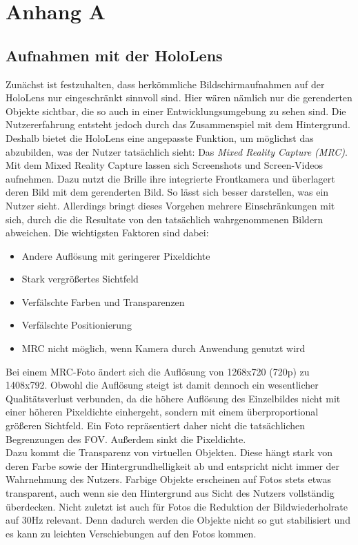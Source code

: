 \appendix 
\section{Anhang A}

\subsection{Aufnahmen mit der HoloLens}
Zunächst ist festzuhalten, dass herkömmliche Bildschirmaufnahmen auf der HoloLens nur eingeschränkt sinnvoll sind. Hier wären nämlich nur die gerenderten Objekte sichtbar, die so auch in einer Entwicklungsumgebung zu sehen sind. Die Nutzererfahrung entsteht jedoch durch das Zusammenspiel mit dem Hintergrund. Deshalb bietet die HoloLens eine angepasste Funktion, um möglichst das abzubilden, was der Nutzer tatsächlich sieht: Das \textit{Mixed Reality Capture (MRC)}.\\

Mit dem Mixed Reality Capture lassen sich Screenshots und Screen-Videos aufnehmen. Dazu nutzt die Brille ihre integrierte Frontkamera und überlagert deren Bild mit dem gerenderten Bild. So lässt sich besser darstellen, was ein Nutzer sieht. Allerdings bringt dieses Vorgehen mehrere Einschränkungen mit sich, durch die die Resultate von den tatsächlich wahrgenommenen Bildern abweichen. Die wichtigsten Faktoren sind dabei:

\begin{itemize}
	\setlength{\itemsep}{-1pt}
	\singlespacing
	\item Andere Auflösung mit geringerer Pixeldichte
	\item Stark vergrößertes Sichtfeld
	\item Verfälschte Farben und Transparenzen
	\item Verfälschte Positionierung
	\item MRC nicht möglich, wenn Kamera durch Anwendung genutzt wird
\end{itemize}

Bei einem MRC-Foto ändert sich die Auflösung von 1268x720 (720p) zu 1408x792. Obwohl die Auflösung steigt ist damit dennoch ein wesentlicher Qualitätsverlust verbunden, da die höhere Auflösung des Einzelbildes nicht mit einer höheren Pixeldichte einhergeht, sondern mit einem überproportional größeren Sichtfeld. Ein Foto repräsentiert daher nicht die tatsächlichen Begrenzungen des FOV. Außerdem sinkt die Pixeldichte.\\

Dazu kommt die Transparenz von virtuellen Objekten. Diese hängt stark von deren Farbe sowie der Hintergrundhelligkeit ab und entspricht nicht immer der Wahrnehmung des Nutzers. Farbige Objekte erscheinen auf Fotos stets etwas transparent, auch wenn sie den Hintergrund aus Sicht des Nutzers vollständig überdecken. Nicht zuletzt ist auch für Fotos die Reduktion der Bildwiederholrate auf 30Hz relevant. Denn dadurch werden die Objekte nicht so gut stabilisiert und es kann zu leichten Verschiebungen auf den Fotos kommen.\\


